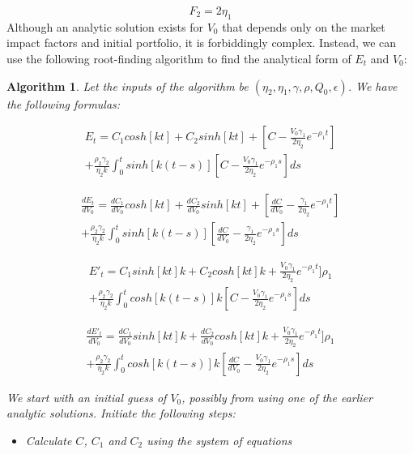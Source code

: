 \documentclass{article}
\newtheorem{algorithm}{Algorithm}
\begin{document}
\[
  F_2 = 2 \eta_1
\]
Although an analytic solution exists for $V_0$ that depends only on the market impact factors and initial portfolio, it is forbiddingly complex. Instead, we can use the following root-finding algorithm to find the analytical form of $E_t$ and $V_0$:
\begin{algorithm}
  Let the inputs of the algorithm be $(\eta_2,\eta_1,\gamma,\rho,Q_0,\epsilon)$. We have the following formulas:

  \[
    \begin{split}
      E_t = C_1 cosh[k t]+ C_2  sinh[k t] + [C- \frac{V_0 \gamma_1}{2 \eta_2} e^{-\rho_1 t}] \\
      + \frac{\rho_2 \gamma_2}{\eta_2 k}\int_0^t sinh[k(t-s)] [C- \frac{V_0 \gamma_1}{2 \eta_2} e^{-\rho_1 s}]ds
    \end{split}
  \]

  \[
    \begin{aligned}
      \frac{dE_t}{dV_0} = \frac{dC_1}{dV_0} cosh[k t]+ \frac{dC_2}{dV_0}  sinh[k t] + [\frac{dC}{dV_0} - \frac{\gamma_1}{2 \eta_2} e^{-\rho_1 t}] \\
      + \frac{\rho_2 \gamma_2}{\eta_2 k}\int_0^t sinh[k(t-s)] [\frac{dC}{dV_0}- \frac{\gamma_1}{2 \eta_2} e^{-\rho_1 s}]ds
    \end{aligned}
  \]

  \[
    \begin{split}
      E'_t = C_1 sinh[k t] k+ C_2 cosh[k t] k + \frac{V_0 \gamma_1}{2 \eta_2} e^{-\rho_1 t}] \rho_1 \\
      + \frac{\rho_2 \gamma_2}{\eta_2 k}\int_0^t cosh[k(t-s)] k [C- \frac{V_0 \gamma_1}{2 \eta_2} e^{-\rho_1 s}]ds
    \end{split}
  \]


  \[
    \begin{split}
      \frac{dE'_t}{dV_0}  = \frac{dC_1}{dV_0} sinh[k t] k + \frac{dC_2}{dV_0} cosh[k t] k + \frac{V_0 \gamma_1}{2 \eta_2} e^{-\rho_1 t}] \rho_1 \\
      + \frac{\rho_2 \gamma_2}{\eta_2 k}\int_0^t cosh[k(t-s)] k [ \frac{dC}{dV_0} - \frac{V_0 \gamma_1}{2 \eta_2} e^{-\rho_1 s}]ds
    \end{split}
  \]

  We start with an initial guess of $V_0$, possibly from using one of the earlier analytic solutions. Initiate the following steps: 

  \begin{itemize}
    \item Calculate $C$, $C_1$ and $C_2$ using the system of equations


\end{itemize}
\end{algorithm}
\end{document}
